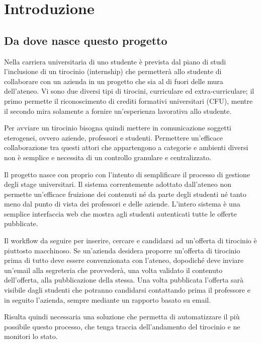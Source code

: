 \nocite{*}

\chapter{Introduzione}

\section{Da dove nasce questo progetto}

Nella carriera universitaria di uno studente è prevista dal piano di studi l'inclusione di un tirocinio (internship) che permetterà allo studente di collaborare con un azienda in un progetto che sia al di fuori delle mura dell'ateneo. Vi sono due diversi tipi di tirocini, curriculare ed extra-curriculare; il primo permette il riconoscimento di crediti formativi universitari (CFU), mentre il secondo mira solamente a fornire un'esperienza lavorativa allo studente.

Per avviare un tirocinio bisogna quindi mettere in comunicazione soggetti eterogenei, ovvero aziende, professori e studenti. Permettere un'efficace collaborazione tra questi attori che appartengono a categorie e ambienti diversi non è semplice e necessita di un controllo granulare e centralizzato.

Il progetto \projectName nasce con proprio con l'intento di semplificare il processo di gestione degli stage universitari. Il sistema correntemente adottato dall'ateneo non permette un'efficace fruizione dei contenuti né da parte degli studenti né tanto meno dal punto di vista dei professori e delle aziende. L'intero sistema è una semplice interfaccia web che mostra agli studenti autenticati tutte le offerte pubblicate.

Il workflow da seguire per inserire, cercare e candidarsi ad un'offerta di tirocinio è piuttosto macchinoso. Se un'azienda desidera proporre un'offerta di tirocinio prima di tutto deve essere convenzionata con l'ateneo, dopodiché deve inviare un'email alla segreteria che provvederà, una volta validato il contenuto dell'offerta, alla pubblicazione della stessa. Una volta pubblicata l'offerta sarà visibile dagli studenti che potranno candidarsi contattando prima il professore e in seguito l'azienda, sempre mediante un rapporto basato su email. 

Risulta quindi necessaria una soluzione che permetta di automatizzare il più possibile questo processo, che tenga traccia dell'andamento del tirocinio e ne monitori lo stato.



